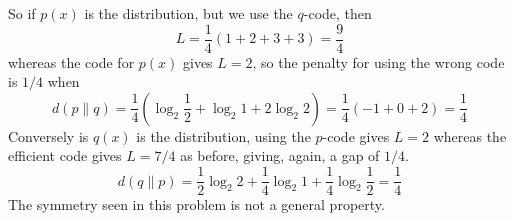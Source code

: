 \documentclass[12pt]{article}
\begin{document}
So if $p(x)$ is the distribution, but we use the $q$-code, then
\begin{equation}
  L=\frac{1}{4}\left(1+2+3+3\right)=\frac{9}{4}
\end{equation}
whereas the code for $p(x)$ gives $L=2$, so the penalty for using the wrong code is $1/4$ when
\begin{equation}
  d(p\|q)=\frac{1}{4}\left(\log_2{\frac{1}{2}}+\log_2{1}+2\log_2{2}\right)=\frac{1}{4}(-1+0+2)=\frac{1}{4}
\end{equation}
Conversely is $q(x)$ is the distribution, using the $p$-code gives $L=2$ whereas the efficient code gives $L=7/4$ as before, giving, again, a gap of $1/4$.
\begin{equation}
  d(q\|p)=\frac{1}{2}\log_2{2}+\frac{1}{4}\log_2{1}+\frac{1}{4}\log_2{\frac{1}{2}}=\frac{1}{4}
\end{equation}
The symmetry seen in this problem is not a general property.
\end{document}
